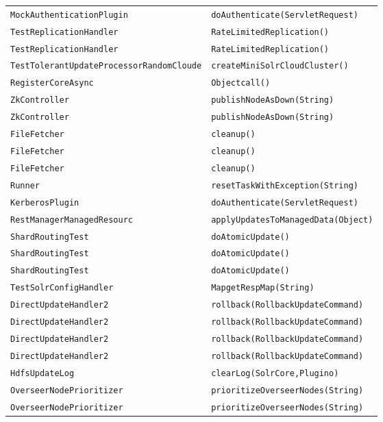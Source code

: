 \begin{center}
\begin{longtable}{ll}
\lstinline/MockAuthenticationPlugin/&{\lstinline/doAuthenticate(ServletRequest)/}\\
\lstinline/TestReplicationHandler/&{\lstinline/RateLimitedReplication()/}\\
\lstinline/TestReplicationHandler/&{\lstinline/RateLimitedReplication()/}\\
\lstinline/TestTolerantUpdateProcessorRandomCloude/&{\lstinline/createMiniSolrCloudCluster()/}\\
\lstinline/RegisterCoreAsync/&{\lstinline/Objectcall()/}\\
\lstinline/ZkController/&{\lstinline/publishNodeAsDown(String)/}\\
\lstinline/ZkController/&{\lstinline/publishNodeAsDown(String)/}\\
\lstinline/FileFetcher/&{\lstinline/cleanup()/}\\
\lstinline/FileFetcher/&{\lstinline/cleanup()/}\\
\lstinline/FileFetcher/&{\lstinline/cleanup()/}\\
\lstinline/Runner/&{\lstinline/resetTaskWithException(String)/}\\
\lstinline/KerberosPlugin/&{\lstinline/doAuthenticate(ServletRequest)/}\\
\lstinline/RestManagerManagedResourc/&{\lstinline/applyUpdatesToManagedData(Object)/}\\
\lstinline/ShardRoutingTest/&{\lstinline/doAtomicUpdate()/}\\
\lstinline/ShardRoutingTest/&{\lstinline/doAtomicUpdate()/}\\
\lstinline/ShardRoutingTest/&{\lstinline/doAtomicUpdate()/}\\
\lstinline/TestSolrConfigHandler/&{\lstinline/MapgetRespMap(String)/}\\
\lstinline/DirectUpdateHandler2/&{\lstinline/rollback(RollbackUpdateCommand)/}\\
\lstinline/DirectUpdateHandler2/&{\lstinline/rollback(RollbackUpdateCommand)/}\\
\lstinline/DirectUpdateHandler2/&{\lstinline/rollback(RollbackUpdateCommand)/}\\
\lstinline/DirectUpdateHandler2/&{\lstinline/rollback(RollbackUpdateCommand)/}\\
\lstinline/HdfsUpdateLog/&{\lstinline/clearLog(SolrCore,Plugino)/}\\
\lstinline/OverseerNodePrioritizer/&{\lstinline/prioritizeOverseerNodes(String)/}\\
\lstinline/OverseerNodePrioritizer/&{\lstinline/prioritizeOverseerNodes(String)/}\\

\end{longtable}
\end{center}
